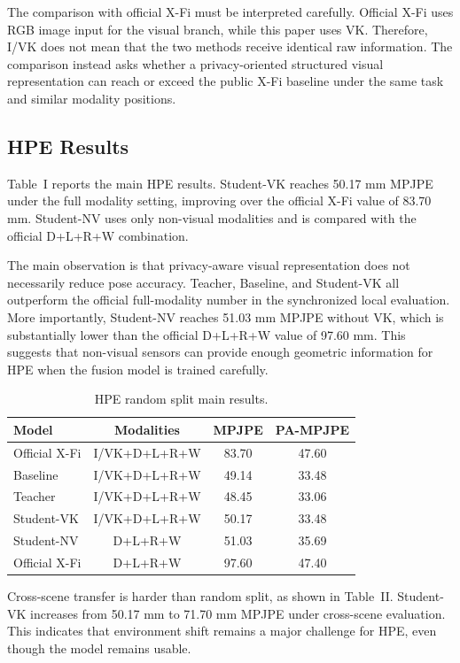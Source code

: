 \documentclass[journal, twocolumn, transmag]{IEEEtran}
\newcommand{\xfi}{X-Fi}
\newcommand{\smalltab}{\scriptsize}
\begin{document}
The comparison with official \xfi{} must be interpreted carefully. Official \xfi{} uses RGB image input for the visual branch, while this paper uses VK. Therefore, I/VK does not mean that the two methods receive identical raw information. The comparison instead asks whether a privacy-oriented structured visual representation can reach or exceed the public \xfi{} baseline under the same task and similar modality positions.

\subsection{HPE Results}
Table~I reports the main HPE results. Student-VK reaches 50.17 mm MPJPE under the full modality setting, improving over the official \xfi{} value of 83.70 mm. Student-NV uses only non-visual modalities and is compared with the official D+L+R+W combination.

The main observation is that privacy-aware visual representation does not necessarily reduce pose accuracy. Teacher, Baseline, and Student-VK all outperform the official full-modality number in the synchronized local evaluation. More importantly, Student-NV reaches 51.03 mm MPJPE without VK, which is substantially lower than the official D+L+R+W value of 97.60 mm. This suggests that non-visual sensors can provide enough geometric information for HPE when the fusion model is trained carefully.

\begin{table}[t]
	\caption{HPE random split main results.}
	\label{tab:hpe-main}
	\centering
	\smalltab
	\begin{tabular}{lccc}
		\toprule
		Model & Modalities & MPJPE & PA-MPJPE\\
		\midrule
		Official \xfi{} & I/VK+D+L+R+W & 83.70 & 47.60\\
		Baseline & I/VK+D+L+R+W & 49.14 & 33.48\\
		Teacher & I/VK+D+L+R+W & 48.45 & 33.06\\
		Student-VK & I/VK+D+L+R+W & 50.17 & 33.48\\
		Student-NV & D+L+R+W & 51.03 & 35.69\\
		Official \xfi{} & D+L+R+W & 97.60 & 47.40\\
		\bottomrule
	\end{tabular}
\end{table}

Cross-scene transfer is harder than random split, as shown in Table~II. Student-VK increases from 50.17 mm to 71.70 mm MPJPE under cross-scene evaluation. This indicates that environment shift remains a major challenge for HPE, even though the model remains usable.
\end{document}
